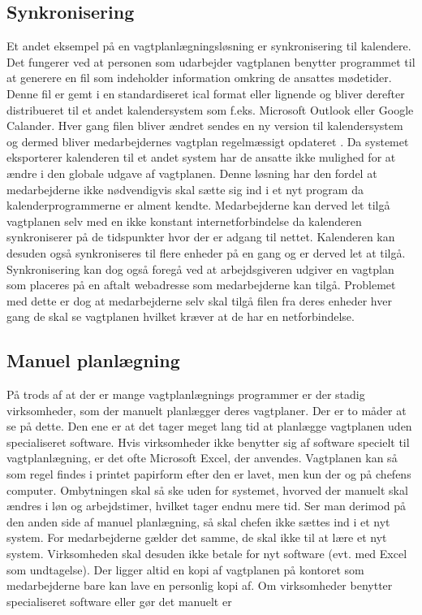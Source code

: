 \subsection{Synkronisering}
Et andet eksempel på en vagtplanlægningsløsning er synkronisering til kalendere. Det fungerer ved at personen som udarbejder vagtplanen benytter programmet til at generere en fil som indeholder information omkring de ansattes mødetider. Denne fil er gemt i en standardiseret ical format eller lignende og bliver derefter distribueret til et andet kalendersystem som f.eks. Microsoft Outlook eller Google Calander. Hver gang filen bliver ændret sendes en ny version til kalendersystem og dermed bliver medarbejdernes vagtplan regelmæssigt opdateret \citep{stage2005}. Da systemet eksporterer kalenderen til et andet system har de ansatte ikke mulighed for at ændre i den globale udgave af vagtplanen. Denne løsning har den fordel at medarbejderne ikke nødvendigvis skal sætte sig ind i et nyt program da kalenderprogrammerne er alment kendte.  Medarbejderne kan derved let tilgå vagtplanen selv med en ikke konstant internetforbindelse da kalenderen synkroniserer på de tidspunkter hvor der er adgang til nettet. Kalenderen kan desuden også synkroniseres til flere enheder på en gang og er derved let at tilgå. Synkronisering kan dog også foregå ved at arbejdsgiveren udgiver en vagtplan som placeres på en aftalt webadresse som medarbejderne kan tilgå. Problemet med dette er dog at medarbejderne selv skal tilgå filen fra deres enheder hver gang de skal se vagtplanen hvilket kræver at de har en netforbindelse.\\

\subsection{Manuel planlægning}
På trods af at der er mange vagtplanlægnings programmer er der stadig virksomheder, som der manuelt planlægger deres vagtplaner. Der er to måder at se på dette. Den ene er at det tager meget lang tid at planlægge vagtplanen uden specialiseret software. Hvis virksomheder ikke benytter sig af software specielt til vagtplanlægning, er det ofte Microsoft Excel, der anvendes.  Vagtplanen kan så som regel findes i printet papirform efter den er lavet, men kun der og på chefens computer. Ombytningen skal så ske uden for systemet, hvorved der manuelt skal ændres i løn og arbejdstimer, hvilket tager endnu mere tid. Ser man derimod på den anden side af manuel planlægning, så skal chefen ikke sættes ind i et nyt system. For medarbejderne gælder det samme, de skal ikke til at lære et nyt system. Virksomheden skal desuden ikke betale for nyt software (evt. med Excel som undtagelse). Der ligger altid en kopi af vagtplanen på kontoret som medarbejderne bare kan lave en personlig kopi af. Om virksomheder benytter specialiseret software eller gør det manuelt er 


